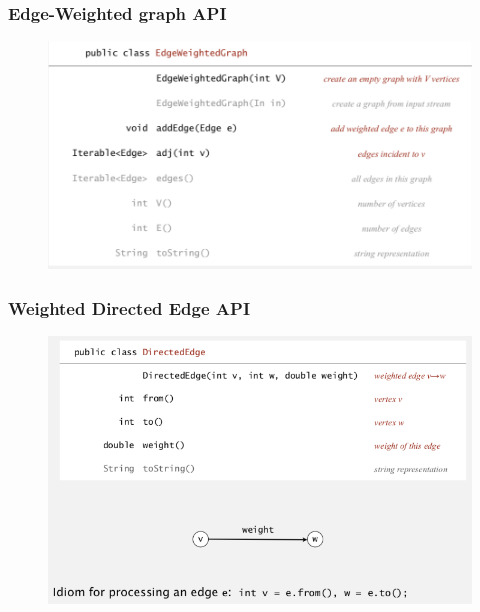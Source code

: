 \documentclass[11pt]{beamer}
\begin{document}
\begin{frame}
	\frametitle	{Edge-Weighted graph API} 
	\begin{figure}
		\centering
		\includegraphics[width=1.05\linewidth]{"Screenshot 2020-12-06 at 3.22.56 PM"}
		\label{fig:screenshot-2020-12-06-at-3}
	\end{figure}	
\end{frame}

  \begin{frame}
	\frametitle	{Weighted Directed Edge API } 
	\begin{figure}
		\centering
		\includegraphics[width=1\linewidth]{"Screenshot 2020-12-06 at 3.40.42 PM"}
		\label{fig:screenshot-2020-12-06-at-3}
	\end{figure}    
\end{frame}
\end{document}
